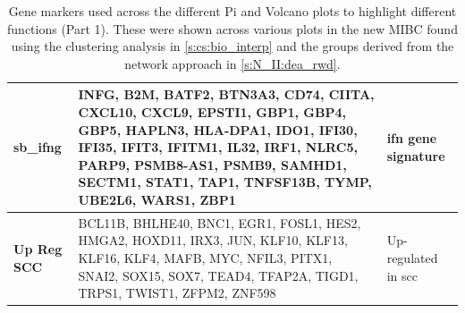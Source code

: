\begin{table}[H]
\begin{tabularx}{\textwidth}{>{\hsize=0.6\hsize}X|>{\hsize=1.4\hsize}X|>{\hsize=1\hsize}X}
        \midrule
        \textbf{sb\_ifng} & INFG, B2M, BATF2, BTN3A3, CD74, CIITA, CXCL10, CXCL9, EPSTI1, GBP1, GBP4, GBP5, HAPLN3, HLA-DPA1, IDO1, IFI30, IFI35, IFIT3, IFITM1, IL32, IRF1, NLRC5, PARP9, PSMB8-AS1, PSMB9, SAMHD1, SECTM1, STAT1, TAP1, TNFSF13B, TYMP, UBE2L6, WARS1, ZBP1 & \acrfull{ifn} gene signature \citet{Baker2022-bj} \\
        \midrule
        \textbf{Up Reg SCC} & BCL11B, BHLHE40, BNC1, EGR1, FOSL1, HES2, HMGA2, HOXD11, IRX3, JUN, KLF10, KLF13, KLF16, KLF4, MAFB, MYC, NFIL3, PITX1, SNAI2, SOX15, SOX7, TEAD4, TFAP2A, TIGD1, TRPS1, TWIST1, ZFPM2, ZNF598 & Up-regulated in \acrfull{scc} \cite{Hurst2022-sp} \\
        \bottomrule
    \end{tabularx}
    \caption{Gene markers used across the different Pi and Volcano plots to highlight different functions (Part 1). These were shown across various plots in the new MIBC found using the clustering analysis in \cref{s:cs:bio_interp} and the groups derived from the network approach in \cref{s:N_II:dea_rwd}. }
    \label{tab:ap:pi_genes_1}
\end{table}


